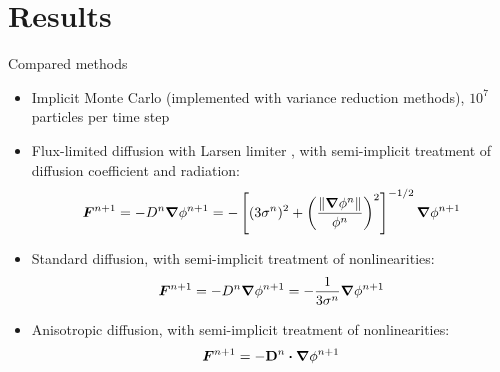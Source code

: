 \documentclass{beamer}
\begin{document}
\section{Results}
\begin{frame}{Compared methods}
\begin{itemize}
  \item Implicit Monte Carlo \cite{Fle1971} (implemented with variance
    reduction methods), $10^7$ particles per time step
  \item Flux-limited diffusion with Larsen limiter \cite{Ols2000}, with
    semi-implicit treatment of diffusion coefficient and radiation:
    \begin{equation*}
      \bm{F}^{n+1} = - D^{n} \bm{\nabla} \phi^{n+1}  = -\left[ (3\sigma^{n})^2
      + \left( \frac{\left\| \bm{\nabla} \phi^{n} \right\|}{\phi^{n}}  \right)^2 \right]^{-1/2}
      \bm{\nabla} \phi^{n+1}
    \end{equation*}
  \item Standard diffusion, with semi-implicit treatment of nonlinearities:
    \begin{equation*}
      \bm{F}^{n+1} = - D^{n} \bm{\nabla} \phi^{n+1} 
      = -\frac{1}{3\sigma^{n}} \bm{\nabla} \phi^{n+1}
    \end{equation*}
  \item Anisotropic diffusion, with semi-implicit treatment of nonlinearities:
    \begin{equation*}
      \bm{F}^{n+1} = -\mathbf{D}^{n}\bm{\cdot} \bm{\nabla} \phi^{n+1} 
    \end{equation*}
\end{itemize}
\end{frame}
\end{document}
